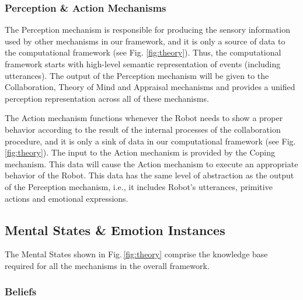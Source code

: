 \subsubsection{Perception \& Action Mechanisms}
\label{sec:tom-mech}

The Perception mechanism is responsible for producing the sensory information
used by other mechanisms in our framework, and it is only a source of data to
the computational framework (see Fig. \ref{fig:theory}). Thus, the computational
framework starts with high-level semantic representation of events (including
utterances). The output of the Perception mechanism will be given to the
Collaboration, Theory of Mind and Appraisal mechanisms and provides a unified
perception representation across all of these mechanisms.

The Action mechanism functions whenever the Robot needs to show a proper
behavior according to the result of the internal processes of the collaboration
procedure, and it is only a sink of data in our computational framework (see
Fig. \ref{fig:theory}). The input to the Action mechanism is provided by the
Coping mechanism. This data will cause the Action mechanism to execute an
appropriate behavior of the Robot. This data has the same level of abstraction
as the output of the Perception mechanism, i.e., it includes Robot's utterances,
primitive actions and emotional expressions.

\subsection{Mental States \& Emotion Instances}

The Mental States shown in Fig.\,\ref{fig:theory} comprise the knowledge base
required for all the mechanisms in the overall framework.

\subsubsection{Beliefs}
\label{sec:beliefs}

